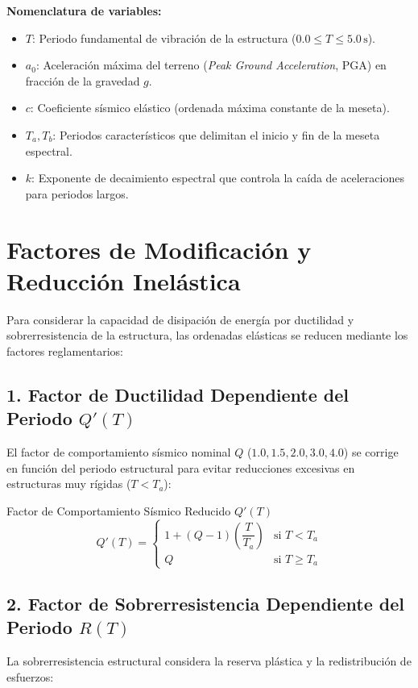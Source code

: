 \documentclass[11pt,a4paper]{article}
\begin{document}
\textbf{Nomenclatura de variables:}
\begin{itemize}[noitemsep]
    \item $T$: Periodo fundamental de vibración de la estructura ($0.0 \le T \le 5.0\,\text{s}$).
    \item $a_0$: Aceleración máxima del terreno (\textit{Peak Ground Acceleration}, PGA) en fracción de la gravedad $g$.
    \item $c$: Coeficiente sísmico elástico (ordenada máxima constante de la meseta).
    \item $T_a, T_b$: Periodos característicos que delimitan el inicio y fin de la meseta espectral.
    \item $k$: Exponente de decaimiento espectral que controla la caída de aceleraciones para periodos largos.
\end{itemize}

\newpage

\section{Factores de Modificación y Reducción Inelástica}
Para considerar la capacidad de disipación de energía por ductilidad y sobrerresistencia de la estructura, las ordenadas elásticas se reducen mediante los factores reglamentarios:

\subsection{1. Factor de Ductilidad Dependiente del Periodo $Q'(T)$}
El factor de comportamiento sísmico nominal $Q$ ($1.0, 1.5, 2.0, 3.0, 4.0$) se corrige en función del periodo estructural para evitar reducciones excesivas en estructuras muy rígidas ($T < T_a$):

\begin{formulabox}{Factor de Comportamiento Sísmico Reducido $Q'(T)$}
$$
Q'(T) = 
\begin{cases} 
1 + (Q - 1) \left(\dfrac{T}{T_a}\right) & \text{si } T < T_a \\[8pt]
Q & \text{si } T \ge T_a
\end{cases}
$$
\end{formulabox}

\subsection{2. Factor de Sobrerresistencia Dependiente del Periodo $R(T)$}
La sobrerresistencia estructural considera la reserva plástica y la redistribución de esfuerzos:
\end{document}
